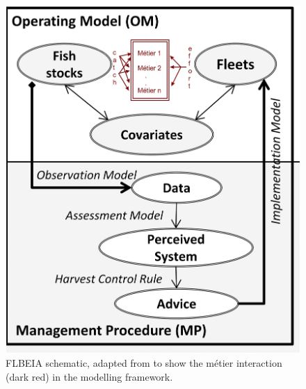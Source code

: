 \documentclass[12pt, halfline, a4paper]{ouparticle}
\begin{document}
\begin{figure}[!ht]
	\centering
	\includegraphics[width=0.6\linewidth]{figures/FLBEIA}
	\caption{FLBEIA schematic, adapted from \cite{Garcia2017} to show the
		métier interaction (dark red) in the modelling framework.} 
	\label{fig:flbeia}
\end{figure}	
\end{document}
